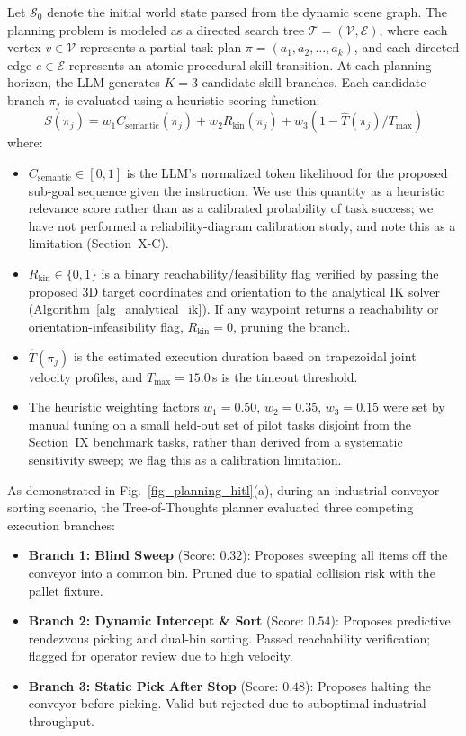 \documentclass[journal]{IEEEtran}
\begin{document}
Let $\mathcal{S}_0$ denote the initial world state parsed from the dynamic scene graph. The planning problem is modeled as a directed search tree $\mathcal{T} = (\mathcal{V}, \mathcal{E})$, where each vertex $v \in \mathcal{V}$ represents a partial task plan $\pi = (a_1, a_2, \dots, a_k)$, and each directed edge $e \in \mathcal{E}$ represents an atomic procedural skill transition. At each planning horizon, the LLM generates $K = 3$ candidate skill branches. Each candidate branch $\pi_j$ is evaluated using a heuristic scoring function:
\begin{equation}
S(\pi_j) = w_1 C_{\text{semantic}}(\pi_j) + w_2 R_{\text{kin}}(\pi_j) + w_3 (1 - \hat{T}(\pi_j)/T_{\text{max}})
\end{equation}
where:
\begin{itemize}
    \item $C_{\text{semantic}} \in [0, 1]$ is the LLM's normalized token likelihood for the proposed sub-goal sequence given the instruction. We use this quantity as a heuristic relevance score rather than as a calibrated probability of task success; we have not performed a reliability-diagram calibration study, and note this as a limitation (Section~X-C).
    \item $R_{\text{kin}} \in \{0, 1\}$ is a binary reachability/feasibility flag verified by passing the proposed 3D target coordinates and orientation to the analytical IK solver (Algorithm~\ref{alg_analytical_ik}). If any waypoint returns a reachability or orientation-infeasibility flag, $R_{\text{kin}} = 0$, pruning the branch.
    \item $\hat{T}(\pi_j)$ is the estimated execution duration based on trapezoidal joint velocity profiles, and $T_{\text{max}} = 15.0$\,s is the timeout threshold.
    \item The heuristic weighting factors $w_1 = 0.50$, $w_2 = 0.35$, $w_3 = 0.15$ were set by manual tuning on a small held-out set of pilot tasks disjoint from the Section~IX benchmark tasks, rather than derived from a systematic sensitivity sweep; we flag this as a calibration limitation.
\end{itemize}

As demonstrated in Fig.~\ref{fig_planning_hitl}(a), during an industrial conveyor sorting scenario, the Tree-of-Thoughts planner evaluated three competing execution branches:
\begin{itemize}
    \item \textbf{Branch 1: Blind Sweep} (Score: $0.32$): Proposes sweeping all items off the conveyor into a common bin. Pruned due to spatial collision risk with the pallet fixture.
    \item \textbf{Branch 2: Dynamic Intercept \& Sort} (Score: $0.54$): Proposes predictive rendezvous picking and dual-bin sorting. Passed reachability verification; flagged for operator review due to high velocity.
    \item \textbf{Branch 3: Static Pick After Stop} (Score: $0.48$): Proposes halting the conveyor before picking. Valid but rejected due to suboptimal industrial throughput.
\end{itemize}
\end{document}
